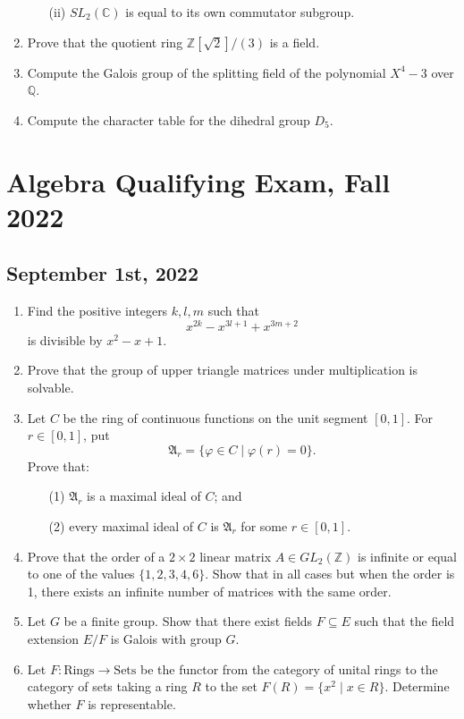 \documentclass{article}
\begin{document}
\begin{enumerate}
\begin{enumerate}
        \item[(ii)] \( SL_2(\mathbb{C}) \) is equal to its own commutator subgroup.
    \end{enumerate}
    \item Prove that the quotient ring \( \mathbb{Z}[\sqrt{2}]/(3) \) is a field.
    \item Compute the Galois group of the splitting field of the polynomial \( X^4 - 3 \) over \( \mathbb{Q} \).
    \item Compute the character table for the dihedral group \( D_5 \).
\end{enumerate}




\section*{Algebra Qualifying Exam, Fall 2022}
\subsection*{September 1st, 2022}

\begin{enumerate}
    \item Find the positive integers \(k, l, m\) such that 
    \[x^{2k} - x^{3l+1} + x^{3m+2}\] 
    is divisible by \(x^2 - x + 1\).

    \item Prove that the group of upper triangle matrices under multiplication is solvable.

    \item Let \(C\) be the ring of continuous functions on the unit segment \([0,1]\). For \(r \in [0,1]\), put 
    \[\mathfrak{A}_r = \{\varphi \in C \mid \varphi(r) = 0\}.\]
    Prove that:
    \begin{itemize}
        \item[(1)] \(\mathfrak{A}_r\) is a maximal ideal of \(C\); and
        \item[(2)] every maximal ideal of \(C\) is \(\mathfrak{A}_r\) for some \(r \in [0,1]\).
    \end{itemize}

    \item Prove that the order of a \(2 \times 2\) linear matrix \(A \in GL_2(\mathbb{Z})\) is infinite or equal to one of the values \(\{1, 2, 3, 4, 6\}\). Show that in all cases but when the order is 1, there exists an infinite number of matrices with the same order.

    \item Let \(G\) be a finite group. Show that there exist fields \(F \subseteq E\) such that the field extension \(E/F\) is Galois with group \(G\).

    \item Let \(F: \text{Rings} \rightarrow \text{Sets}\) be the functor from the category of unital rings to the category of sets taking a ring \(R\) to the set \(F(R) = \{x^2 \mid x \in R\}\). Determine whether \(F\) is representable.
\end{enumerate}
\end{document}
